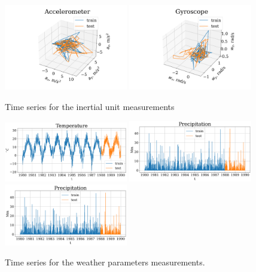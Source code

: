 \documentclass[referee, pdflatex, sn-mathphys-num]{sn-jnl}
\theoremstyle{definition}
\theoremstyle{plain}
\begin{document}
	\begin{figure}[!htbp]
		\centering
		\includegraphics[width=0.48\textwidth, keepaspectratio]{acceleromter_example.png}
		\includegraphics[width=0.48\textwidth, keepaspectratio]{gyro_example.png}
		\caption{Time series for the inertial unit measurements}\label{fig:motion_data}
	\end{figure}
	
	\begin{figure}[!htbp]
		\centering
		\includegraphics[width=0.48\textwidth, keepaspectratio]{Temperature_example.png}
		\includegraphics[width=0.48\textwidth, keepaspectratio]{Precipitation_example.png}
		\includegraphics[width=0.48\textwidth, keepaspectratio]{Precipitation_example.png}
		\caption{Time series for the weather parameters measurements.}\label{fig:weather_data}
	\end{figure}
	
\end{document}
